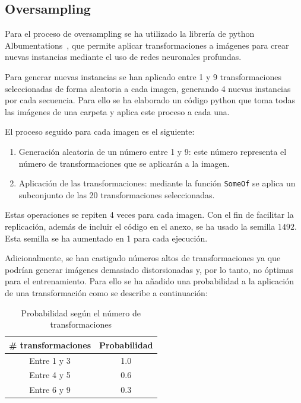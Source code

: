 \documentclass[12pt]{report} %
\begin{document}
    \subsection{Oversampling}

    Para el proceso de oversampling se ha utilizado la librería de python
    Albumentations~\cite{albumentations}, que permite aplicar transformaciones a imágenes
    para crear nuevas instancias mediante el uso de redes neuronales profundas.
    
    Para generar nuevas instancias se han aplicado entre 1 y 9 transformaciones
    seleccionadas de forma aleatoria a cada imagen, generando 4
    nuevas instancias por cada secuencia. Para ello se ha elaborado un código
    python que toma todas las imágenes de una carpeta y aplica este proceso a
    cada una.

    El proceso seguido para cada imagen es el siguiente: 
    \begin{enumerate}
        \item Generación aleatoria de un número entre 1 y 9: este número representa el número de transformaciones que se aplicarán a la imagen.
        \item Aplicación de las transformaciones: mediante la función \texttt{SomeOf} se aplica un subconjunto de las 20 transformaciones seleccionadas.
    \end{enumerate}
    Estas operaciones se repiten 4 veces para cada imagen. Con el fin de
    facilitar la replicación, además de incluir el código en el anexo, se ha
    usado la semilla $1492$. Esta semilla se ha aumentado en 1 para cada
    ejecución.

    Adicionalmente, se han castigado números altos de transformaciones ya
    que podrían generar imágenes demasiado distorsionadas y, por lo tanto, no
    óptimas para el entrenamiento. Para ello se ha añadido una probabilidad a
    la aplicación de una transformación como se describe a continuación:

    \begin{table}[H]
    \centering
        \begin{tabular}{cc}
        \toprule
        \textbf{\# transformaciones} & \textbf{Probabilidad} \\
        \midrule
        Entre 1 y 3 & 1.0\\
        Entre 4 y 5 & 0.6\\
        Entre 6 y 9 & 0.3\\
        \bottomrule
        \end{tabular}
    \caption{Probabilidad según el número de transformaciones}
    \end{table}
\end{document}
